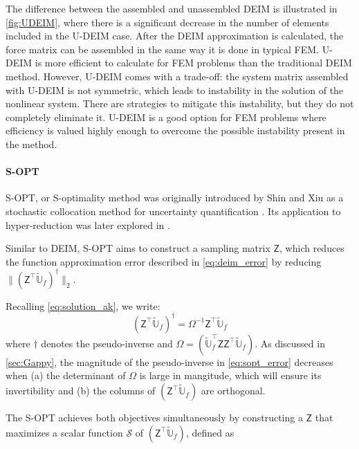 \documentclass[11pt]{article}
\newcommand{\mat}[1]{\mathsf{#1}}
\begin{document}
        The difference between the assembled and unassembled DEIM is illustrated in \cref{fig:UDEIM}, where there is a significant decrease in the number of elements included in the U-DEIM case.
        After the DEIM approximation is calculated, the force matrix can be assembled in the same way it is done in typical FEM.
        U-DEIM is more efficient to calculate for FEM problems than the traditional DEIM method.
        However, U-DEIM comes with a trade-off: the system matrix assembled with U-DEIM is not symmetric, which leads to instability in the solution of the nonlinear system.
        There are strategies to mitigate this instability, but they do not completely eliminate it.
        U-DEIM is a good option for FEM problems where efficiency is valued highly enough to overcome the possible instability present in the method.
        \paragraph{S-OPT} S-OPT, or S-optimality method was originally introduced by Shin and Xiu as a stochastic collocation method for uncertainty quantification \cite{shin2016SOPT}.
        Its application to hyper-reduction was later explored in \cite{lauzon2024s-opt}.


        Similar to DEIM, S-OPT aims to construct a sampling matrix $\mat{Z}$, which reduces the function approximation error described in \cref{eq:deim_error} by reducing $\|\left(\mat{Z}^\top \widetilde{\mathbb{U}}_f\right)^{\dagger}\|_2$.


        Recalling \cref{eq:solution_ak}, we write:
        \begin{equation}
        \left(\mat{Z}^{\top}\widetilde{\mathbb{U}}_f\right)^{\dagger} = \Omega^{-1}\mat{Z}^{\top}\widetilde{\mathbb{U}}_f
        \label{eq:sopt_error}
        \end{equation}
        where $\dagger$ denotes the pseudo-inverse and $\Omega = \left(\widetilde{\mathbb{U}}_f^{\top}\mat{Z}\mat{Z}^{\top}\widetilde{\mathbb{U}}_f\right)$.
        As discussed in \cref{sec:Gappy}, the magnitude of the pseudo-inverse in \cref{eq:sopt_error} decreases when (a) the determinant of $\Omega$ is large in mangitude, which will ensure its invertibility and (b) the columns of $\left(\mat{Z}^\top \widetilde{\mathbb{U}}_f\right)$ are orthogonal.


        The S-OPT achieves both objectives simultaneously by constructing a $\mat{Z}$ that maximizes a scalar function $\mathscr{S}$ of $\left(\mat{Z}^\top \widetilde{\mathbb{U}}_f\right)$, defined as
\end{document}

